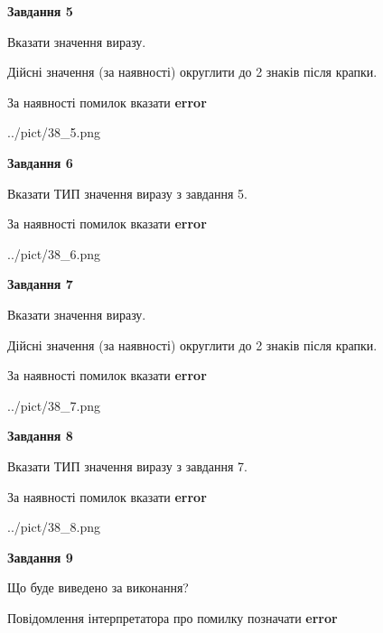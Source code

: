 \documentclass[11pt, ukrainian]{article}
\begin{document}
{\begin {large}
{\begin {center}\textbf{Завдання 5}\end {center}}\par
Вказати значення виразу. \par
Дійсні значення (за наявності) округлити до 2 знаків після крапки. \par
За наявності помилок вказати \textbf{error}

\begin{center}
	{../pict/38_5.png}
\end{center}
\newpage

{\begin {center}\textbf{Завдання 6}\end {center}}\par
Вказати ТИП значення виразу з завдання 5. \par
За наявності помилок вказати \textbf{error}

\begin{center}
	{../pict/38_6.png}
\end{center}
\newpage

{\begin {center}\textbf{Завдання 7}\end {center}}\par
Вказати значення виразу. \par
Дійсні значення (за наявності) округлити до 2 знаків після крапки. \par
За наявності помилок вказати \textbf{error}

\begin{center}
	{../pict/38_7.png}
\end{center}
\newpage

{\begin {center}\textbf{Завдання 8}\end {center}}\par
Вказати ТИП значення виразу з завдання 7. \par
За наявності помилок вказати \textbf{error}

\begin{center}
	{../pict/38_8.png}
\end{center}
\newpage

{\begin {center}\textbf{Завдання 9}\end {center}}\par
Що буде виведено за виконання? \par
Повідомлення інтерпретатора про помилку позначати \textbf{error}


\end{large}}
\end{document}
